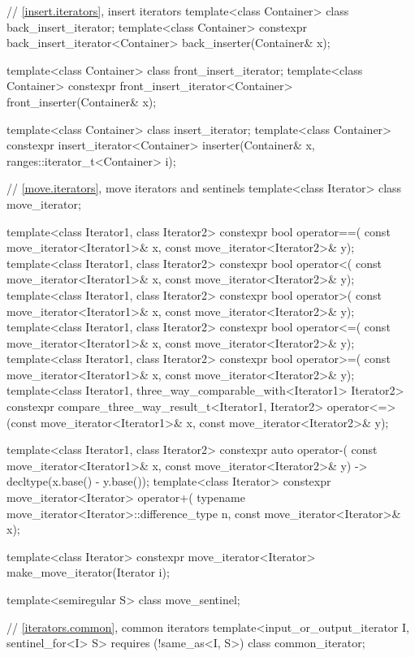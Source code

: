 \begin{codeblock}
{  // \ref{insert.iterators}, insert iterators
  template<class Container> class back_insert_iterator;
  template<class Container>
    constexpr back_insert_iterator<Container> back_inserter(Container& x);

  template<class Container> class front_insert_iterator;
  template<class Container>
    constexpr front_insert_iterator<Container> front_inserter(Container& x);

  template<class Container> class insert_iterator;
  template<class Container>
    constexpr insert_iterator<Container>
      inserter(Container& x, ranges::iterator_t<Container> i);

  // \ref{move.iterators}, move iterators and sentinels
  template<class Iterator> class move_iterator;

  template<class Iterator1, class Iterator2>
    constexpr bool operator==(
      const move_iterator<Iterator1>& x, const move_iterator<Iterator2>& y);
  template<class Iterator1, class Iterator2>
    constexpr bool operator<(
      const move_iterator<Iterator1>& x, const move_iterator<Iterator2>& y);
  template<class Iterator1, class Iterator2>
    constexpr bool operator>(
      const move_iterator<Iterator1>& x, const move_iterator<Iterator2>& y);
  template<class Iterator1, class Iterator2>
    constexpr bool operator<=(
      const move_iterator<Iterator1>& x, const move_iterator<Iterator2>& y);
  template<class Iterator1, class Iterator2>
    constexpr bool operator>=(
      const move_iterator<Iterator1>& x, const move_iterator<Iterator2>& y);
  template<class Iterator1, three_way_comparable_with<Iterator1> Iterator2>
    constexpr compare_three_way_result_t<Iterator1, Iterator2>
      operator<=>(const move_iterator<Iterator1>& x,
                  const move_iterator<Iterator2>& y);

  template<class Iterator1, class Iterator2>
    constexpr auto operator-(
    const move_iterator<Iterator1>& x,
    const move_iterator<Iterator2>& y) -> decltype(x.base() - y.base());
  template<class Iterator>
    constexpr move_iterator<Iterator> operator+(
      typename move_iterator<Iterator>::difference_type n, const move_iterator<Iterator>& x);

  template<class Iterator>
    constexpr move_iterator<Iterator> make_move_iterator(Iterator i);

  template<semiregular S> class move_sentinel;

  // \ref{iterators.common}, common iterators
  template<input_or_output_iterator I, sentinel_for<I> S>
    requires (!same_as<I, S>)
      class common_iterator;

}
\end{codeblock}
